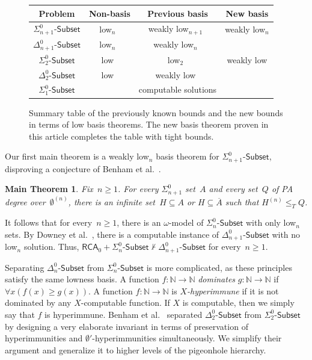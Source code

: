 \documentclass{article}
\def\NN{\mathbb{N}}
\newcommand{\Sub}[1]{{#1}\mbox{-}\mathsf{Subset}}
\newcommand{\RCA}{\mathsf{RCA}}
\numberwithin{theorem}{section}
\newtheorem{maintheorem}[theorem]{Main Theorem}
\theoremstyle{definition}
\begin{document}
\begin{figure}[htbp]
\begin{center}
\bgroup
\def\arraystretch{1.5}%
\begin{tabular}{|c|c|c|c|} \hline
Problem & Non-basis & Previous basis & New basis\\ \hline
$\Sub{\Sigma^0_{n+1}}$ & low${}_n$~\cite{downey2001delta2} & weakly low${}_{n+1}$~\cite{monin2021weakness} & weakly low${}_n$ \\
$\Sub{\Delta^0_{n+1}}$ & low${}_n$~\cite{downey2001delta2} & weakly low${}_n$~\cite{monin2021weakness} & \\
$\Sub{\Sigma^0_2}$ & low~\cite{downey2001delta2} & low${}_2$~\cite{benham2024ginsburg} & weakly low \\
$\Sub{\Delta^0_2}$ & low~\cite{downey2001delta2} & weakly low~\cite{cholak2001strength} & \\
$\Sub{\Sigma^0_1}$ & & computable solutions & \\ \hline
\end{tabular}
\egroup
\end{center}
\caption{Summary table of the previously known bounds and the new bounds in terms of low basis theorems.
The new basis theorem proven in this article completes the table with tight bounds.}
\end{figure}

Our first main theorem is a weakly low${}_n$ basis theorem for $\Sub{\Sigma^0_{n+1}}$, disproving a conjecture of Benham et al.~\cite{benham2024ginsburg}.

\begin{maintheorem}\label{thm:main-weakly-low-basis}
Fix~$n \geq 1$. For every $\Sigma^0_{n+1}$ set~$A$ and every set~$Q$ of PA degree over~$\emptyset^{(n)}$, there is an infinite set~$H \subseteq A$ or $H \subseteq \overline{A}$ such that $H^{(n)} \leq_T Q$.
\end{maintheorem}

It follows that for every~$n \geq 1$, there is an $\omega$-model of $\Sub{\Sigma^0_n}$ with only low${}_n$ sets.
By Downey et al.~\cite{downey2001delta2}, there is a computable instance of $\Sub{\Delta^0_{n+1}}$ with no low${}_n$ solution. Thus, $\RCA_0 + \Sub{\Sigma^0_n} \nvdash \Sub{\Delta^0_{n+1}}$ for every~\mbox{$n \geq 1$}.

Separating $\Sub{\Delta^0_n}$ from $\Sub{\Sigma^0_n}$ is more complicated, as these princi\-ples satisfy the same lowness basis. A function $f : \NN \to \NN$ \emph{dominates} $g : \NN \to \NN$ if $\forall x(f(x) \geq g(x))$. A function $f : \NN \to \NN$ is \emph{$X$-hyperimmune} if it is not dominated by any $X$-computable function. If $X$ is computable, then we simply say that $f$ is hyperimmune. Benham et al.~\cite{benham2024ginsburg} separated $\Sub{\Delta^0_2}$ from $\Sub{\Sigma^0_2}$ by designing a very elaborate invariant in terms of preservation of hyperimmunities and $\emptyset'$-hyperimmunities simultaneously. We simplify their argument and generalize it to higher levels of the pigeonhole hierarchy.
\end{document}
